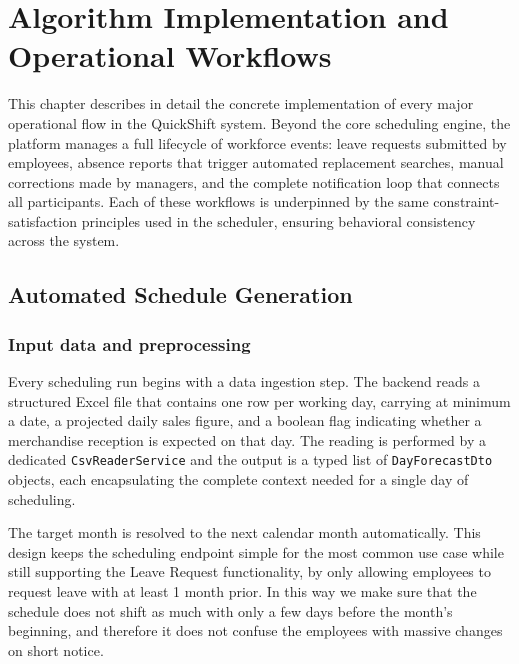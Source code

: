 \chapter{Algorithm Implementation and Operational Workflows}
\label{chap:ch4}

\par This chapter describes in detail the concrete implementation of every major operational flow in the QuickShift system. Beyond the core scheduling engine, the platform manages a full lifecycle of workforce events: leave requests submitted by employees, absence reports that trigger automated replacement searches, manual corrections made by managers, and the complete notification loop that connects all participants. Each of these workflows is underpinned by the same constraint-satisfaction principles used in the scheduler, ensuring behavioral consistency across the system.

\section{Automated Schedule Generation}
\label{sec:automated_schedule_generation}

\subsection{Input data and preprocessing}
\par Every scheduling run begins with a data ingestion step. The backend reads a structured Excel file that contains one row per working day, carrying at minimum a date, a projected daily sales figure, and a boolean flag indicating whether a merchandise reception is expected on that day. The reading is performed by a dedicated \texttt{CsvReaderService} and the output is a typed list of \texttt{DayForecastDto} objects, each encapsulating the complete context needed for a single day of scheduling.

\par The target month is resolved to the next calendar month automatically. This design keeps the scheduling endpoint simple for the most common use case while still supporting the Leave Request functionality, by only allowing employees to request leave with at least 1 month prior. In this way we make sure that the schedule does not shift as much with only a few days before the month's beginning, and therefore it does not confuse the employees with massive changes on short notice.

